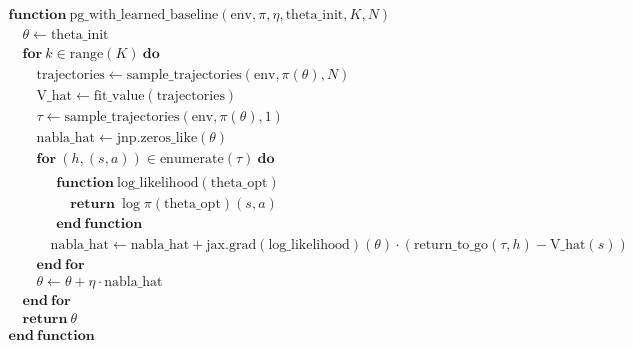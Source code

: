\documentclass[
  letterpaper,
  DIV=11,
  numbers=noendperiod]{scrreprt}
\theoremstyle{plain}
\theoremstyle{plain}
\theoremstyle{definition}
\theoremstyle{definition}
\theoremstyle{remark}
\begin{document}
$ \begin{array}{l} \mathbf{function} \ \mathrm{pg\_with\_learned\_baseline}(\mathrm{env}, \pi, \eta, \mathrm{theta\_init}, K, N) \\ \hspace{1em} \theta \gets \mathrm{theta\_init} \\ \hspace{1em} \mathbf{for} \ k \in \mathrm{range} \mathopen{}\left( K \mathclose{}\right) \ \mathbf{do} \\ \hspace{2em} \mathrm{trajectories} \gets \mathrm{sample\_trajectories} \mathopen{}\left( \mathrm{env}, \pi \mathopen{}\left( \theta \mathclose{}\right), N \mathclose{}\right) \\ \hspace{2em} \mathrm{V\_hat} \gets \mathrm{fit\_value} \mathopen{}\left( \mathrm{trajectories} \mathclose{}\right) \\ \hspace{2em} \tau \gets \mathrm{sample\_trajectories} \mathopen{}\left( \mathrm{env}, \pi \mathopen{}\left( \theta \mathclose{}\right), 1 \mathclose{}\right) \\ \hspace{2em} \mathrm{nabla\_hat} \gets \mathrm{jnp}.\mathrm{zeros\_like} \mathopen{}\left( \theta \mathclose{}\right) \\ \hspace{2em} \mathbf{for} \ \mathopen{}\left( h, \mathopen{}\left( s, a \mathclose{}\right) \mathclose{}\right) \in \mathrm{enumerate} \mathopen{}\left( \tau \mathclose{}\right) \ \mathbf{do} \\ \begin{array}{l} \hspace{3em} \mathbf{function} \ \mathrm{log\_likelihood}(\mathrm{theta\_opt}) \\ \hspace{4em} \mathbf{return} \ \log \pi \mathopen{}\left( \mathrm{theta\_opt} \mathclose{}\right) \mathopen{}\left( s, a \mathclose{}\right) \\ \hspace{3em} \mathbf{end \ function} \end{array} \\ \hspace{3em} \mathrm{nabla\_hat} \gets \mathrm{nabla\_hat} + \mathrm{jax}.\mathrm{grad} \mathopen{}\left( \mathrm{log\_likelihood} \mathclose{}\right) \mathopen{}\left( \theta \mathclose{}\right) \cdot \mathopen{}\left( \mathrm{return\_to\_go} \mathopen{}\left( \tau, h \mathclose{}\right) - \mathrm{V\_hat} \mathopen{}\left( s \mathclose{}\right) \mathclose{}\right) \\ \hspace{2em} \mathbf{end \ for} \\ \hspace{2em} \theta \gets \theta + \eta \cdot \mathrm{nabla\_hat} \\ \hspace{1em} \mathbf{end \ for} \\ \hspace{1em} \mathbf{return} \ \theta \\ \mathbf{end \ function} \end{array} $
\end{document}
